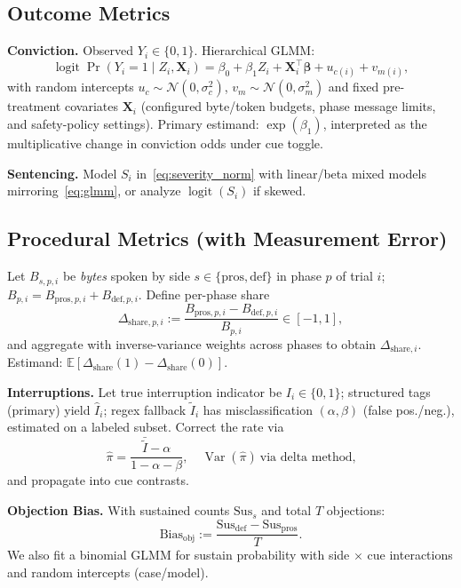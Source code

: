 \documentclass[conference]{IEEEtran}
\begin{document}
\subsection{Outcome Metrics}
\label{sec:outcomes}
\textbf{Conviction.} Observed $Y_i\in\{0,1\}$. Hierarchical GLMM:
\begin{equation}
\label{eq:glmm}
\operatorname{logit}\Pr(Y_i{=}1\mid Z_i,\bm{X}_i) =
\beta_0 + \beta_1 Z_i + \bm{X}_i^\top\bm{\beta} + u_{c(i)} + v_{m(i)},
\end{equation}
with random intercepts $u_c\sim\mathcal{N}(0,\sigma_c^2)$, $v_m\sim\mathcal{N}(0,\sigma_m^2)$ and fixed pre-treatment covariates $\bm{X}_i$ (configured byte/token budgets, phase message limits, and safety-policy settings). Primary estimand: $\exp(\beta_1)$, interpreted as the multiplicative change in conviction odds under cue toggle.

\textbf{Sentencing.} Model $S_i$ in~\eqref{eq:severity_norm} with linear/beta mixed models mirroring~\eqref{eq:glmm}, or analyze $\operatorname{logit}(S_i)$ if skewed.

\subsection{Procedural Metrics (with Measurement Error)}
Let $B_{s,p,i}$ be \emph{bytes} spoken by side $s\in\{\text{pros},\text{def}\}$ in phase $p$ of trial $i$; $B_{p,i}=B_{\text{pros},p,i}+B_{\text{def},p,i}$. Define per-phase share
\begin{equation}
\Delta_{\text{share},p,i} := \frac{B_{\text{pros},p,i}-B_{\text{def},p,i}}{B_{p,i}} \in [-1,1] ,
\label{eq:share}
\end{equation}
and aggregate with inverse-variance weights across phases to obtain $\Delta_{\text{share},i}$. Estimand: $\mathbb{E}[\Delta_{\text{share}}(1)-\Delta_{\text{share}}(0)]$.

\textbf{Interruptions.} Let true interruption indicator be $I_i\in\{0,1\}$; structured tags (primary) yield $\widehat{I}_i$; regex fallback $\widetilde{I}_i$ has misclassification $(\alpha,\beta)$ (false pos./neg.), estimated on a labeled subset. Correct the rate via
\begin{equation}
\widehat{\pi} = \frac{\bar{\widetilde{I}} - \alpha}{1 - \alpha - \beta}, \quad
\operatorname{Var}(\widehat{\pi}) \ \text{via delta method,}
\label{eq:me_correction}
\end{equation}
and propagate into cue contrasts.

\textbf{Objection Bias.} With sustained counts $\text{Sus}_s$ and total $T$ objections:
\begin{equation}
\text{Bias}_{\text{obj}} := \frac{\text{Sus}_{\text{def}}-\text{Sus}_{\text{pros}}}{T} .
\label{eq:objection_bias}
\end{equation}
We also fit a binomial GLMM for sustain probability with side $\times$ cue interactions and random intercepts (case/model).
\end{document}
